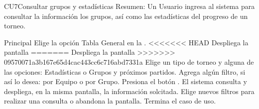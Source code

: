 
	\begin{UseCase}{CU7}{Consultar grupos y estadísticas}{
		Resumen: Un Usuario ingresa al sistema para consultar la información los grupos, así como las estadísticas del progreso de un torneo.	}
	\end{UseCase}
	\newpage
	\begin{UCtrayectoria}{Principal}
	\UCpaso[\UCactor] Elige la opción Tabla General en la .
<<<<<<< HEAD
	\UCpaso Despliega la pantalla 
=======
	\UCpaso Despliega la pantalla 
>>>>>>> 09570071a3b167e65d4cac443cc6c716abd7331a
	\UCpaso[\UCactor] Elige un tipo de torneo y alguna de las opciones: Estadísticas o Grupos y próximos partidos.
	\UCpaso[\UCactor] Agrega algún filtro, si así lo desea: por Equipo o por Grupo.	
	\UCpaso[\UCactor] Presiona el botón .	
	\UCpaso El sistema consulta y despliega, en la misma pantalla, la información solcitada.
	\UCpaso[\UCactor] Elige nuevos filtros para realizar una consulta o abandona la pantalla.
	\UCpaso Termina el caso de uso.
\end{UCtrayectoria}

